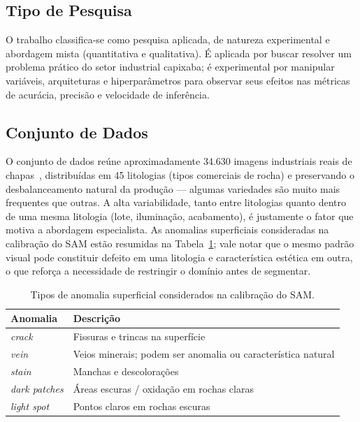 \documentclass[12pt]{article}
\begin{document}
\subsection{Tipo de Pesquisa}

O trabalho classifica-se como pesquisa aplicada, de natureza experimental e abordagem mista (quantitativa e qualitativa). É aplicada por buscar resolver um problema prático do setor industrial capixaba; é experimental por manipular variáveis, arquiteturas e hiperparâmetros para observar seus efeitos nas métricas de acurácia, precisão e velocidade de inferência.

\subsection{Conjunto de Dados}

O conjunto de dados reúne aproximadamente 34.630 imagens industriais reais de chapas~\cite{dataset_araujo2023}, distribuídas em 45 litologias (tipos comerciais de rocha) e preservando o desbalanceamento natural da produção --- algumas variedades são muito mais frequentes que outras. A alta variabilidade, tanto entre litologias quanto dentro de uma mesma litologia (lote, iluminação, acabamento), é justamente o fator que motiva a abordagem especialista. As anomalias superficiais consideradas na calibração do SAM estão resumidas na Tabela~\ref{tab:anomalias}; vale notar que o mesmo padrão visual pode constituir defeito em uma litologia e característica estética em outra, o que reforça a necessidade de restringir o domínio antes de segmentar.

\begin{table}[ht]
\centering
\caption{Tipos de anomalia superficial considerados na calibração do SAM.}
\label{tab:anomalias}
\begin{tabular}{ll}
\hline
\textbf{Anomalia} & \textbf{Descrição} \\
\hline
\textit{crack} & Fissuras e trincas na superfície \\
\textit{vein} & Veios minerais; podem ser anomalia ou característica natural \\
\textit{stain} & Manchas e descolorações \\
\textit{dark patches} & Áreas escuras / oxidação em rochas claras \\
\textit{light spot} & Pontos claros em rochas escuras \\
\hline
\end{tabular}
\end{table}
\end{document}
